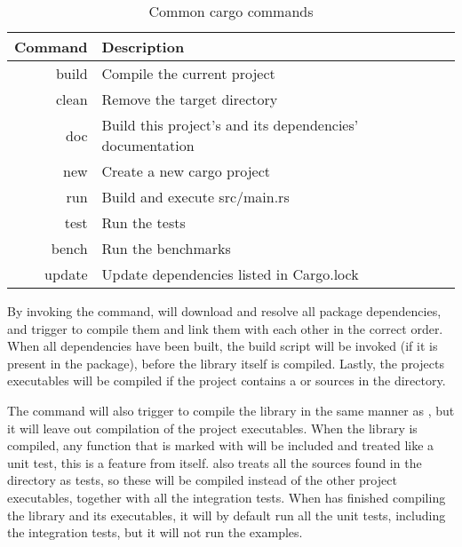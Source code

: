 \begin{table}[ht]
\begin{center}
\begin{tabular}{r|l}
\textbf{Command} & \textbf{Description}                           \\
\hline
build  & Compile the current project                              \\
clean  & Remove the target directory                              \\
doc    & Build this project's and its dependencies' documentation \\
new    & Create a new cargo project                               \\
run    & Build and execute src/main.rs                            \\
test   & Run the tests                                            \\
bench  & Run the benchmarks                                       \\
update & Update dependencies listed in Cargo.lock                 \\
\hline
\end{tabular}
\caption{Common cargo commands}
\label{tab:common_cargo_commands}
\end{center}
\end{table}

By invoking the  command, \cargo will download and resolve all package dependencies, and trigger  to compile them and link them with each other in the correct order.
When all dependencies have been built, the build script will be invoked (if it is present in the package), before the library itself is compiled.
Lastly, the projects executables will be compiled if the project contains a  or sources in the  directory.

The  command will also trigger  to compile the library in the same manner as , but it will leave out compilation of the project executables.
When the library is compiled, any function that is marked with \attrib{\#[test]} will be included and treated like a unit test, this is a feature from \rust itself.
\cargo also treats all the sources found in the  directory as tests, so these will be compiled instead of the other project executables, together with all the integration tests.
When \cargo has finished compiling the library and its executables, it will by default run all the unit tests, including the integration tests, but it will not run the examples.

